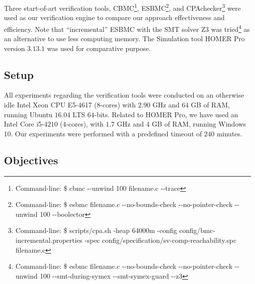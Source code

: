 \documentclass[review]{elsarticle}
\begin{document}
Three start-of-art verification tools, CBMC\footnote{Command-line: \$ cbmc -\phantom{}-unwind 100 filename.c -\phantom{}-trace}, ESBMC\footnote{Command-line: \$ esbmc filename.c -\phantom{}-no-bounds-check -\phantom{}-no-pointer-check -\phantom{}-unwind 100 -\phantom{}-boolector}, %
and CPAchecker\footnote{Command-line: \$ scripts/cpa.sh -heap 64000m -config config/bmc-incremental.properties -spec config/specification/sv-comp-reachability.spc filename.c} were used as our verification engine to compare our approach effectiveness and efficiency. Note that ``incremental'' ESBMC with the SMT solver Z3 was tried\footnote{Command-line: \$ esbmc filename.c -\phantom{}-no-bounds-check -\phantom{}-no-pointer-check -\phantom{}-unwind 100 -\phantom{}-smt-during-symex -\phantom{}-smt-symex-guard -\phantom{}-z3} as an alternative to use less computing memory. The Simulation tool HOMER Pro version $3.13.1$ was used for comparative purpose.

\subsection{Setup} 

All experiments regarding the verification tools were conducted 
on an otherwise idle Intel Xeon CPU E5-4617 ($8$-cores) with 
$2.90$ GHz and $64$ GB of RAM, running Ubuntu $16.04$ LTS $64$-bits. 
Related to HOMER Pro, we have used an Intel Core i5-$4210$ ($4$-cores), 
with $1.7$ GHz and $4$ GB of RAM, running Windows 10. 
Our experiments were performed with a predefined timeout of $240$ minutes.

\subsection{Objectives} 
\end{document}
